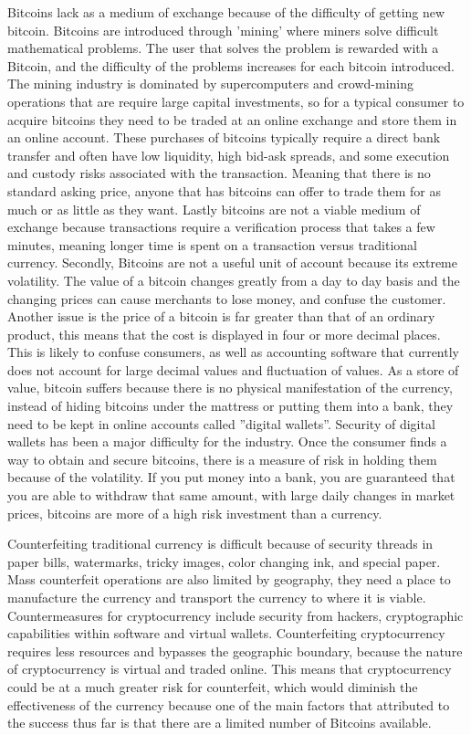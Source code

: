 \documentclass[12pt]{article}
\begin{document}
	Bitcoins lack as a medium of exchange because of the difficulty of getting new bitcoin.
	Bitcoins are introduced through 'mining' where miners solve difficult mathematical
	problems. The user that solves the problem is rewarded with a Bitcoin, and the difficulty
	of the problems increases for each bitcoin introduced. The mining industry is dominated 
	by supercomputers and crowd-mining operations that are require large capital
	investments, so for a typical consumer to acquire bitcoins they need to be traded at an
	online exchange and store them in an online account. These purchases of bitcoins
	typically require a direct bank transfer and often have
	low liquidity, high bid-ask spreads, and some execution and custody risks associated
	with the transaction. Meaning that there is no standard asking price, anyone that has
	bitcoins can offer to trade them for as much or as little as they want.
	Lastly bitcoins are not a viable medium of exchange because transactions require a
	verification process
	that takes a few minutes, meaning longer time is spent on a transaction versus
	traditional currency. Secondly, Bitcoins are not a useful unit of account because 
	its extreme volatility.
	The value of a bitcoin changes greatly from a day to day basis and the changing prices
	can cause merchants to lose money, and confuse the customer. Another issue is the price
	of a bitcoin is far greater than that of an ordinary product, this means that the cost
	is displayed in four or more decimal places. This is likely to confuse consumers, as
	well as accounting software that currently does not account for large decimal values
	and fluctuation of values.
	As a store of value, bitcoin suffers because there is no physical manifestation of
	the currency, instead of hiding bitcoins under the mattress or putting them into a bank,
	they need to
	be kept in online accounts called ''digital wallets''. Security of digital wallets has
	been a major difficulty for the industry. Once the consumer finds a way to obtain and
	secure bitcoins, there is a measure of risk in holding them because of the volatility.
	If you put money into a bank, you are guaranteed that you are able to withdraw that
	same amount, with large daily changes in market prices, bitcoins are more of a high
	risk investment than a currency.\autocite{chap2}

	Counterfeiting traditional currency is difficult because of security threads in paper
	bills, watermarks, tricky images, color changing ink, and special paper. Mass
	counterfeit operations are also limited by geography, they need a place to
	manufacture the currency and transport the
	currency to where it is viable. Countermeasures for cryptocurrency include security
	from hackers, cryptographic capabilities within software and virtual wallets.
	Counterfeiting cryptocurrency requires less resources and bypasses the geographic
	boundary, because the nature of cryptocurrency is virtual and traded online. This
	means that cryptocurrency could be at a much greater risk for counterfeit, which
	would diminish the effectiveness of the currency because one of the main factors
	that attributed to the success thus far is that there are a limited number of
	Bitcoins available.\autocite{chap8} 
\end{document}
